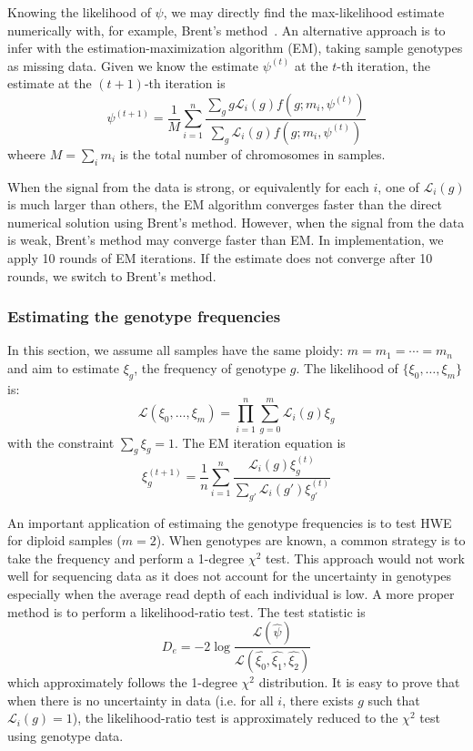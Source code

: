 \documentclass{bioinfo}
\begin{document}
\begin{methods}
Knowing the likelihood of $\psi$, we may directly find the max-likelihood estimate
numerically with, for example, Brent's method~\citep{Brent:1973kx}. An alternative approach is to 
infer with the estimation-maximization algorithm (EM), taking sample genotypes as missing data. Given
we know the estimate $\psi^{(t)}$ at the $t$-th iteration, the estimate at the $(t+1)$-th
iteration is
\begin{equation}
\psi^{(t+1)}=\frac{1}{M}\sum_{i=1}^n\frac{\sum_{g}g\mathcal{L}_i(g)f(g;m_i,\psi^{(t)})}{\sum_{g}\mathcal{L}_i(g)f(g;m_i,\psi^{(t)})}
\end{equation}
wheere $M=\sum_im_i$ is the total number of chromosomes in samples.

When the signal from the data is strong, or equivalently for each $i$, one of $\mathcal{L}_i(g)$
is much larger than others, the EM algorithm converges faster than the direct numerical
solution using Brent's method. However, when the signal from the data is weak,
Brent's method may converge faster than EM. In implementation, we apply 10 rounds of
EM iterations. If the estimate does not converge after 10 rounds, we switch to Brent's method.

\subsubsection{Estimating the genotype frequencies}
In this section, we assume all samples have the same ploidy: $m=m_1=\cdots=m_n$
and aim to estimate $\xi_g$, the frequency of genotype $g$. The likelihood
of $\{\xi_0,\ldots,\xi_m\}$ is:
\begin{equation}
\mathcal{L}(\xi_0,\ldots,\xi_m)=\prod_{i=1}^n\sum_{g=0}^{m}\mathcal{L}_i(g)\xi_g
\end{equation}
with the constraint $\sum_g\xi_g=1$. The EM iteration equation is
\begin{equation}
\xi^{(t+1)}_g=\frac{1}{n}\sum_{i=1}^n\frac{\mathcal{L}_i(g)\xi^{(t)}_g}{\sum_{g'}\mathcal{L}_i(g')\xi_{g'}^{(t)}}
\end{equation}

An important application of estimaing the genotype frequencies is to test HWE for diploid samples ($m=2$).
When genotypes are known, a common strategy is to take the frequency and perform a 1-degree $\chi^2$ test. This
approach would not work well for sequencing data as it does not account for the uncertainty in
genotypes especially when the average read depth of each individual is low. A more proper
method is to perform a likelihood-ratio test. The test statistic is
$$
D_e=-2\log\frac{\mathcal{L}(\hat{\psi})}{\mathcal{L}(\hat{\xi_0},\hat{\xi_1},\hat{\xi_2})}
$$
which approximately follows the 1-degree $\chi^2$ distribution.
It is easy to prove that when there is no uncertainty in data (i.e. for all $i$, there exists
$g$ such that $\mathcal{L}_i(g)=1$), the likelihood-ratio test
is approximately reduced to the $\chi^2$ test using genotype data.


\end{methods}
\end{document}

